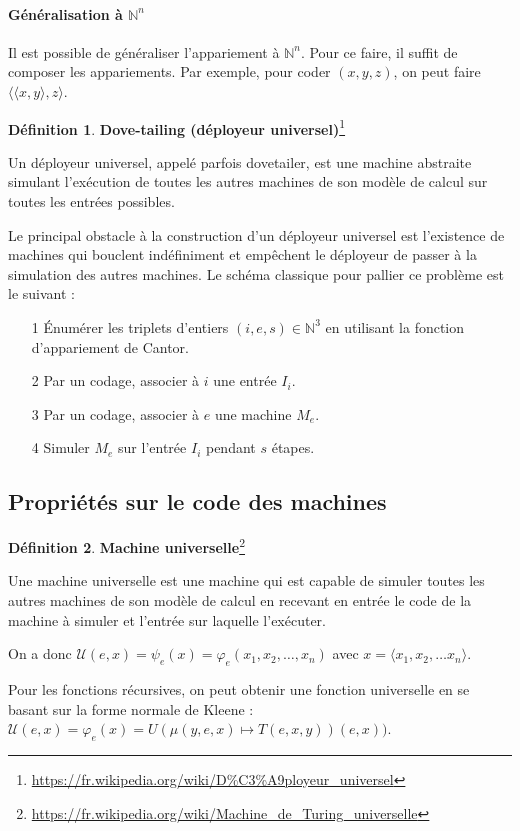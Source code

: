 \documentclass{book}
\theoremstyle{definition}
\newtheorem{definition}{Définition}
\numberwithin{lemma}{subsection}
\numberwithin{theorem}{subsection}
\numberwithin{definition}{subsection}
\numberwithin{proposition}{subsection}
\numberwithin{corollary}{subsection}
\numberwithin{property}{subsection}
\numberwithin{example}{subsection}
\numberwithin{heuristique}{subsection}
\numberwithin{scenario}{subsection}
\begin{document}
            \paragraph{Généralisation à $\mathbb{N}^n$} Il est possible de généraliser l'appariement à $\mathbb{N}^n$. Pour ce faire, il suffit de composer les appariements. Par exemple, pour coder $(x,y,z)$, on peut faire $\langle \langle x,y \rangle, z\rangle$.
            \begin{definition}\textbf{Dove-tailing (déployeur universel)}\footnote{\url{https://fr.wikipedia.org/wiki/D\%C3\%A9ployeur\_universel}}
                \par Un déployeur universel, appelé parfois dovetailer, est une machine abstraite simulant l’exécution de toutes les autres machines de son modèle de calcul sur toutes les entrées possibles.
                \par Le principal obstacle à la construction d’un déployeur universel est l’existence de machines qui bouclent indéfiniment et empêchent le déployeur de passer à la simulation des autres machines. Le schéma classique pour pallier ce problème est le suivant :
                \begin{itemize}
                    \item[1] Énumérer les triplets d’entiers $(i,e,s)\in \mathbb{N} ^{3}$ en utilisant la fonction d'appariement de Cantor.
                    \item[2] Par un codage, associer à $i$ une entrée $I_{i}$.
                    \item[3] Par un codage, associer à $e$ une machine $M_{e}$.
                    \item[4] Simuler $M_{e}$ sur l’entrée $I_{i}$ pendant $s$ étapes.
                \end{itemize}
            \end{definition}
        \subsection{Propriétés sur le code des machines}
            \begin{definition}\textbf{Machine universelle}\footnote{\url{https://fr.wikipedia.org/wiki/Machine\_de\_Turing\_universelle}}
                \par Une machine universelle est une machine qui est capable de simuler toutes les autres machines de son modèle de calcul en recevant en entrée le code de la machine à simuler et l'entrée sur laquelle l'exécuter.
                \par On a donc $\mathcal{U}(e,x) = \psi_e(x) = \varphi_e(x_1,x_2,\ldots,x_n)$ avec $x = \langle x_1, x_2, \ldots x_n\rangle$.
                \par Pour les fonctions récursives, on peut obtenir une fonction universelle en se basant sur la forme normale de Kleene : $\mathcal{U}(e,x) = \varphi_e(x) = U(\mu(y,e,x) \mapsto T(e,x,y))(e,x))$.
            \end{definition}
            
\end{document}

